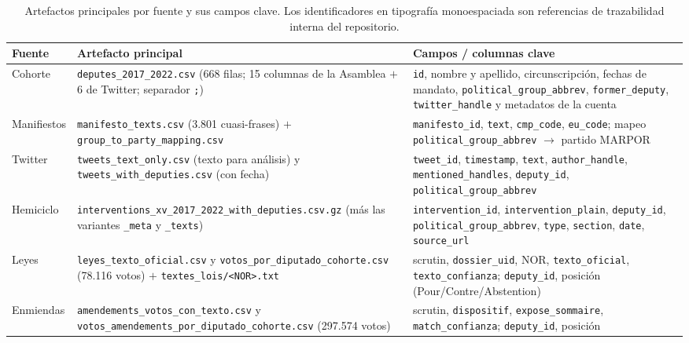 \begin{table}[H]
\centering
\caption{Artefactos principales por fuente y sus campos clave. Los
identificadores en tipografía monoespaciada son referencias de trazabilidad
interna del repositorio.}
\label{tab:anexo-artefactos}
\footnotesize
\renewcommand{\arraystretch}{1.2}
\setlength{\tabcolsep}{4pt}
\begin{tabularx}{\textwidth}{@{}l W W@{}}
\toprule
\textbf{Fuente} & \textbf{Artefacto principal} & \textbf{Campos / columnas clave} \\
\midrule
Cohorte &
\texttt{deputes\_2017\_2022.csv} (668 filas; 15 columnas de la Asamblea $+$ 6 de
Twitter; separador \texttt{;}) &
\texttt{id}, nombre y apellido, circunscripción, fechas de mandato,
\texttt{political\_group\_abbrev}, \texttt{former\_deputy}, \texttt{twitter\_handle}
y metadatos de la cuenta \\
\addlinespace
Manifiestos &
\texttt{manifesto\_texts.csv} (3.801 cuasi-frases) $+$
\texttt{group\_to\_party\_mapping.csv} &
\texttt{manifesto\_id}, \texttt{text}, \texttt{cmp\_code}, \texttt{eu\_code};
mapeo \texttt{political\_group\_abbrev} $\rightarrow$ partido MARPOR \\
\addlinespace
Twitter &
\texttt{tweets\_text\_only.csv} (texto para análisis) y
\texttt{tweets\_with\_deputies.csv} (con fecha) &
\texttt{tweet\_id}, \texttt{timestamp}, \texttt{text}, \texttt{author\_handle},
\texttt{mentioned\_handles}, \texttt{deputy\_id}, \texttt{political\_group\_abbrev} \\
\addlinespace
Hemiciclo &
\texttt{interventions\_xv\_2017\_2022\_with\_deputies.csv.gz} (más las variantes
\texttt{\_meta} y \texttt{\_texts}) &
\texttt{intervention\_id}, \texttt{intervention\_plain}, \texttt{deputy\_id},
\texttt{political\_group\_abbrev}, \texttt{type}, \texttt{section}, \texttt{date},
\texttt{source\_url} \\
\addlinespace
Leyes &
\texttt{leyes\_texto\_oficial.csv} y \texttt{votos\_por\_diputado\_cohorte.csv}
(78.116 votos) $+$ \texttt{textes\_lois/<NOR>.txt} &
scrutin, \texttt{dossier\_uid}, NOR, \texttt{texto\_oficial},
\texttt{texto\_confianza}; \texttt{deputy\_id}, posición (Pour/Contre/Abstention) \\
\addlinespace
Enmiendas &
\texttt{amendements\_votos\_con\_texto.csv} y
\texttt{votos\_amendements\_por\_diputado\_cohorte.csv} (297.574 votos) &
scrutin, \texttt{dispositif}, \texttt{expose\_sommaire}, \texttt{match\_confianza};
\texttt{deputy\_id}, posición \\
\bottomrule
\end{tabularx}
\end{table}

